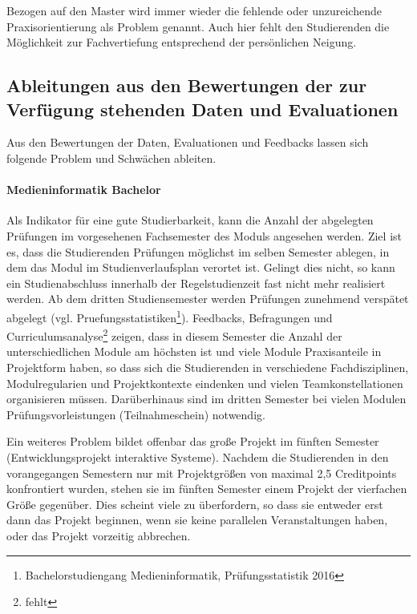 Bezogen auf den Master wird immer wieder die fehlende oder unzureichende
Praxisorientierung als Problem genannt. Auch hier fehlt den Studierenden
die Möglichkeit zur Fachvertiefung entsprechend der persönlichen
Neigung.

\subsection{Ableitungen aus den Bewertungen der zur Verfügung
stehenden Daten und
Evaluationen}\label{ableitungen-aus-den-bewertungen-der-zur-verfuxfcgung-stehenden-daten-und-evaluationen}

Aus den Bewertungen der Daten, Evaluationen und Feedbacks lassen sich
folgende Problem und Schwächen ableiten.

\paragraph{Medieninformatik Bachelor}\label{medieninformatik-bachelor}

Als Indikator für eine gute Studierbarkeit, kann die Anzahl der
abgelegten Prüfungen im vorgesehenen Fachsemester des Moduls angesehen
werden. Ziel ist es, dass die Studierenden Prüfungen möglichst im selben
Semester ablegen, in dem das Modul im Studienverlaufsplan verortet ist.
Gelingt dies nicht, so kann ein Studienabschluss innerhalb der
Regelstudienzeit fast nicht mehr realisiert werden. Ab dem dritten
Studiensemester werden Prüfungen zunehmend verspätet abgelegt (vgl.
Pruefungsstatistiken\footnote{Bachelorstudiengang Medieninformatik,
  Prüfungsstatistik 2016}). Feedbacks, Befragungen und
Curriculumsanalyse\footnote{fehlt} zeigen, dass in diesem Semester die
Anzahl der unterschiedlichen Module am höchsten ist und viele Module
Praxisanteile in Projektform haben, so dass sich die Studierenden in
verschiedene Fachdisziplinen, Modulregularien und Projektkontexte
eindenken und vielen Teamkonstellationen organisieren müssen.
Darüberhinaus sind im dritten Semester bei vielen Modulen
Prüfungsvorleistungen (Teilnahmeschein) notwendig.

Ein weiteres Problem bildet offenbar das große Projekt im fünften
Semester (Entwicklungsprojekt interaktive Systeme). Nachdem die
Studierenden in den vorangegangen Semestern nur mit Projektgrößen von
maximal 2,5 Creditpoints konfrontiert wurden, stehen sie im fünften
Semester einem Projekt der vierfachen Größe gegenüber. Dies scheint
viele zu überfordern, so dass sie entweder erst dann das Projekt
beginnen, wenn sie keine parallelen Veranstaltungen haben, oder das
Projekt vorzeitig abbrechen.

